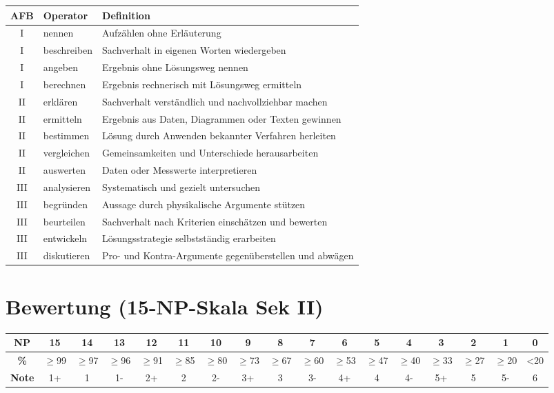 \documentclass[11pt,a4paper]{article}
\begin{document}
\begin{center}
\footnotesize
\begin{tabularx}{\textwidth}{c|l|X}
\rowcolor{lightblue}
\textbf{AFB} & \textbf{Operator} & \textbf{Definition} \\
\hline
I & nennen & Aufzählen ohne Erläuterung \\
\rowcolor{lightgray}
I & beschreiben & Sachverhalt in eigenen Worten wiedergeben \\
I & angeben & Ergebnis ohne Lösungsweg nennen \\
\rowcolor{lightgray}
I & berechnen & Ergebnis rechnerisch mit Lösungsweg ermitteln \\
\hline
II & erklären & Sachverhalt verständlich und nachvollziehbar machen \\
\rowcolor{lightgray}
II & ermitteln & Ergebnis aus Daten, Diagrammen oder Texten gewinnen \\
II & bestimmen & Lösung durch Anwenden bekannter Verfahren herleiten \\
\rowcolor{lightgray}
II & vergleichen & Gemeinsamkeiten und Unterschiede herausarbeiten \\
II & auswerten & Daten oder Messwerte interpretieren \\
\hline
\rowcolor{lightgray}
III & analysieren & Systematisch und gezielt untersuchen \\
III & begründen & Aussage durch physikalische Argumente stützen \\
\rowcolor{lightgray}
III & beurteilen & Sachverhalt nach Kriterien einschätzen und bewerten \\
III & entwickeln & Lösungsstrategie selbstständig erarbeiten \\
\rowcolor{lightgray}
III & diskutieren & Pro- und Kontra-Argumente gegenüberstellen und abwägen \\
\hline
\end{tabularx}
\end{center}

\section{Bewertung (15-NP-Skala Sek II)}

\begin{center}
\footnotesize
\begin{tabular}{c|c|c|c|c|c|c|c|c|c|c|c|c|c|c|c|c}
\rowcolor{lightblue}
\textbf{NP} & 15 & 14 & 13 & 12 & 11 & 10 & 9 & 8 & 7 & 6 & 5 & 4 & 3 & 2 & 1 & 0 \\
\hline
\textbf{\%} & $\geq$99 & $\geq$97 & $\geq$96 & $\geq$91 & $\geq$85 & $\geq$80 & $\geq$73 & $\geq$67 & $\geq$60 & $\geq$53 & $\geq$47 & $\geq$40 & $\geq$33 & $\geq$27 & $\geq$20 & <20 \\
\rowcolor{lightgray}
\textbf{Note} & 1+ & 1 & 1- & 2+ & 2 & 2- & 3+ & 3 & 3- & 4+ & 4 & 4- & 5+ & 5 & 5- & 6 \\
\hline
\end{tabular}
\end{center}
\end{document}
